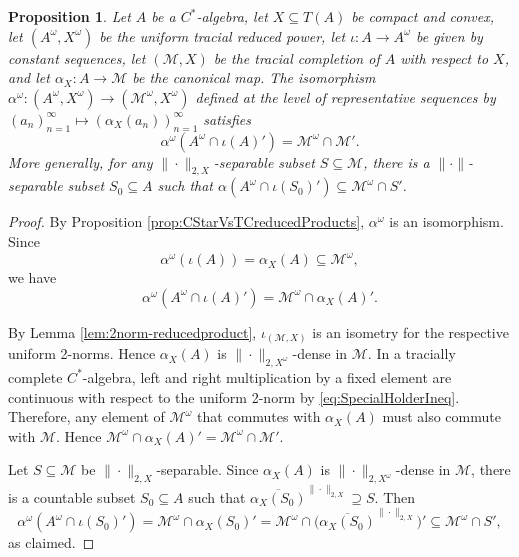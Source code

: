 \documentclass[a4paper,11pt]{amsart}
\newtheorem{proposition}[theorem]{Proposition}
\theoremstyle{definition}
\numberwithin{equation}{section}
\numberwithin{theorem}{section}
\newcommand{\M}{\mathcal{M}}
\begin{document}
\begin{proposition}\label{rem:CStarVsTCreducedProducts}
Let $A$ be a $C^*$-algebra, let $X \subseteq T(A)$ be compact and convex, let $(A^\omega, X^\omega)$ be the uniform tracial reduced power, let $\iota:A \rightarrow A^\omega$ be given by constant sequences,
let $(\M, X)$ be the tracial completion of $A$ with respect to $X$, and let $\alpha_X:A \rightarrow \M$ be the canonical map. 
The isomorphism $\alpha^\omega:(A^\omega, X^\omega) \rightarrow (\M^\omega,  X^\omega)$ defined at the level of representative sequences by $(a_n)_{n=1}^\infty  \mapsto (\alpha_X(a_n))_{n=1}^\infty$ satisfies 
\begin{equation}
	\alpha^\omega(A^\omega \cap \iota(A)') = \M^\omega \cap \M'.
\end{equation}
More generally, for any $\|\cdot\|_{2,X}$-separable subset $S \subseteq \M$, there is a $\|\cdot\|$-separable subset $S_0 \subseteq A$ such that $\alpha(A^\omega \cap \iota(S_0)') \subseteq \M^\omega \cap S'$.
\end{proposition}
\begin{proof} 
By Proposition \ref{prop:CStarVsTCreducedProducts}, $\alpha^\omega$ is an isomorphism. 
Since 
\begin{equation}
 \alpha^\omega(\iota(A)) = \alpha_X(A) \subseteq \mathcal M^\omega,
\end{equation}
we have 
\begin{equation}
	\alpha^\omega(A^\omega \cap \iota(A)') = \M^\omega \cap \alpha_X(A)'.
\end{equation}

By Lemma \ref{lem:2norm-reducedproduct}, $\iota_{(\M, X)}$ is an isometry for the respective uniform 2-norms. Hence $\alpha_X(A)$ is  $\|\cdot\|_{2,X^\omega}$-dense in $\M$. 
In a tracially complete $C^*$-algebra, left and right multiplication by a fixed element are continuous with respect to the uniform 2-norm by \eqref{eq:SpecialHolderIneq}. Therefore, any element of $\M^\omega$ that commutes with $\alpha_X(A)$ must also commute with $\M$. Hence  $\M^\omega \cap \alpha_X(A)' = \M^\omega \cap \M'$.

Let $S \subseteq \M$ be $\|\cdot\|_{2,X}$-separable. Since $\alpha_X(A)$ is $\|\cdot\|_{2,X^\omega}$-dense in $\M$, there is a countable subset $S_0 \subseteq A$ such that $\overline{\alpha_X(S_0)}^{\|\cdot\|_{2,X}} \supseteq S$. Then 
\begin{equation}
    \alpha^\omega(A^\omega \cap \iota(S_0)') = \M^\omega \cap \alpha_X(S_0)' = \M^\omega \cap \big(\overline{\alpha_X(S_0)}^{\|\cdot\|_{2,X}}\big)' \subseteq \M^\omega \cap S',
\end{equation}
as claimed.
\end{proof}
\end{document}

